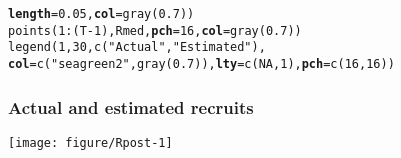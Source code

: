 \documentclass[color=usenames,dvipsnames]{beamer}\usepackage[]{graphicx}\usepackage[]{color}
\makeatletter
\newcommand{\hlnum}[1]{\textcolor[rgb]{0.69,0.494,0}{#1}}%
\newcommand{\hlstr}[1]{\textcolor[rgb]{0.749,0.012,0.012}{#1}}%
\newcommand{\hlopt}[1]{\textcolor[rgb]{0,0,0}{#1}}%
\newcommand{\hlstd}[1]{\textcolor[rgb]{0,0,0}{#1}}%
\newcommand{\hlkwc}[1]{\textcolor[rgb]{0,0,0}{\textbf{#1}}}%
\newcommand{\hlkwd}[1]{\textcolor[rgb]{0.004,0.004,0.506}{#1}}%
\newenvironment{kframe}{%
 \def\at@end@of@kframe{}%
 \ifinner\ifhmode%
  \def\at@end@of@kframe{\end{minipage}}%
  \begin{minipage}{\columnwidth}%
 \fi\fi%
 \def\FrameCommand##1{\hskip\@totalleftmargin \hskip-\fboxsep
 \colorbox{shadecolor}{##1}\hskip-\fboxsep
     \hskip-\linewidth \hskip-\@totalleftmargin \hskip\columnwidth}%
 \MakeFramed {\advance\hsize-\width
   \@totalleftmargin\z@ \linewidth\hsize
   \@setminipage}}%
 {\par\unskip\endMakeFramed%
 \at@end@of@kframe}
\newenvironment{knitrout}{}{} %
\makeatother
\begin{document}
\begin{frame}[fragile]
\begin{knitrout}
\begin{kframe}
\begin{alltt}
       \hlkwc{length}\hlstd{=}\hlnum{0.05}\hlstd{,} \hlkwc{col}\hlstd{=}\hlkwd{gray}\hlstd{(}\hlnum{0.7}\hlstd{))}
\hlkwd{points}\hlstd{(}\hlnum{1}\hlopt{:}\hlstd{(T}\hlopt{-}\hlnum{1}\hlstd{), Rmed,} \hlkwc{pch}\hlstd{=}\hlnum{16}\hlstd{,} \hlkwc{col}\hlstd{=}\hlkwd{gray}\hlstd{(}\hlnum{0.7}\hlstd{))}
\hlkwd{legend}\hlstd{(}\hlnum{1}\hlstd{,} \hlnum{30}\hlstd{,} \hlkwd{c}\hlstd{(}\hlstr{"Actual"}\hlstd{,} \hlstr{"Estimated"}\hlstd{),}
       \hlkwc{col}\hlstd{=}\hlkwd{c}\hlstd{(}\hlstr{"seagreen2"}\hlstd{,} \hlkwd{gray}\hlstd{(}\hlnum{0.7}\hlstd{)),} \hlkwc{lty}\hlstd{=}\hlkwd{c}\hlstd{(}\hlnum{NA}\hlstd{,}\hlnum{1}\hlstd{),} \hlkwc{pch}\hlstd{=}\hlkwd{c}\hlstd{(}\hlnum{16}\hlstd{,}\hlnum{16}\hlstd{))}
\end{alltt}
\end{kframe}
\end{knitrout}
\end{frame}





\begin{frame}
  \frametitle{Actual and estimated recruits}
  \begin{center}
    \texttt{[image: figure/Rpost-1]}
  \end{center}
\end{frame}
\end{document}
